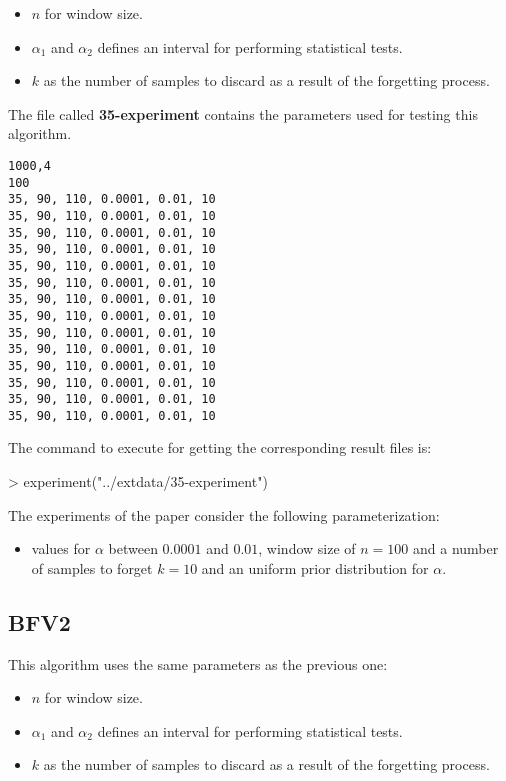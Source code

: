 \documentclass{article}
\begin{document}
\begin{itemize}
\item $n$ for window size.
\item $\alpha_1$ and $\alpha_2$ defines an interval for performing statistical tests.
\item $k$ as the number of samples to discard as a result of the forgetting process.
\end{itemize}

The file called \textbf{35-experiment} contains the parameters
used for testing this algorithm.

\begin{verbatim}
1000,4
100
35, 90, 110, 0.0001, 0.01, 10
35, 90, 110, 0.0001, 0.01, 10
35, 90, 110, 0.0001, 0.01, 10
35, 90, 110, 0.0001, 0.01, 10
35, 90, 110, 0.0001, 0.01, 10
35, 90, 110, 0.0001, 0.01, 10
35, 90, 110, 0.0001, 0.01, 10
35, 90, 110, 0.0001, 0.01, 10
35, 90, 110, 0.0001, 0.01, 10
35, 90, 110, 0.0001, 0.01, 10
35, 90, 110, 0.0001, 0.01, 10
35, 90, 110, 0.0001, 0.01, 10
35, 90, 110, 0.0001, 0.01, 10
35, 90, 110, 0.0001, 0.01, 10
\end{verbatim}

The command to execute for getting the corresponding result files is:

\begin{Schunk}
\begin{Sinput}
> experiment("../extdata/35-experiment")
\end{Sinput}
\end{Schunk}

The experiments of the paper consider the following parameterization:

\begin{itemize}
\item values for $\alpha$ between $0.0001$ and $0.01$, window size
of $n=100$ and a number of samples to forget $k=10$ and an uniform prior distribution
for $\alpha$.
\end{itemize}

\subsection{BFV2}

This algorithm uses the same parameters as the previous one:

\begin{itemize}
\item $n$ for window size.
\item $\alpha_1$ and $\alpha_2$ defines an interval for performing statistical tests.
\item $k$ as the number of samples to discard as a result of the forgetting process.
\end{itemize}
\end{document}
